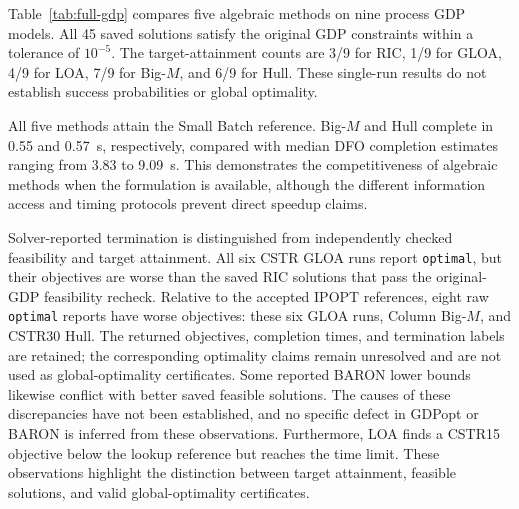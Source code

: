 \documentclass{article}
\begin{document}
\FloatBarrier


Table~\ref{tab:full-gdp} compares five algebraic methods on nine process GDP models.
All 45 saved solutions satisfy the original GDP constraints within a tolerance of $10^{-5}$.
The target-attainment counts are 3/9 for RIC, 1/9 for GLOA, 4/9 for LOA, 7/9 for Big-$M$, and 6/9 for Hull.
These single-run results do not establish success probabilities or global optimality.

All five methods attain the Small Batch reference.
Big-$M$ and Hull complete in 0.55 and 0.57~s, respectively, compared with median DFO completion estimates ranging from 3.83 to 9.09~s.
This demonstrates the competitiveness of algebraic methods when the formulation is available, although the different information access and timing protocols prevent direct speedup claims.

Solver-reported termination is distinguished from independently checked feasibility and target attainment.
All six CSTR GLOA runs report \texttt{optimal}, but their objectives are worse than the saved RIC solutions that pass the original-GDP feasibility recheck. Relative to the accepted IPOPT references, eight raw \texttt{optimal} reports have worse objectives: these six GLOA runs, Column Big-$M$, and CSTR30 Hull. The returned objectives, completion times, and termination labels are retained; the corresponding optimality claims remain unresolved and are not used as global-optimality certificates.
Some reported BARON lower bounds likewise conflict with better saved feasible solutions. The causes of these discrepancies have not been established, and no specific defect in GDPopt or BARON is inferred from these observations.
Furthermore, LOA finds a CSTR15 objective below the lookup reference but reaches the time limit.
These observations highlight the distinction between target attainment, feasible solutions, and valid global-optimality certificates.
\end{document}
